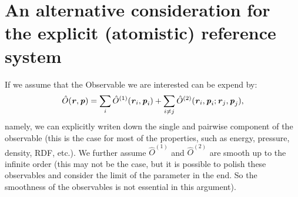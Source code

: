 \documentclass[aps,pre,preprint,unsortedaddress]{revtex4}
\renewcommand{\v}[1]{\textbf{\textit{#1}}}
\begin{document}
\section{An alternative consideration for the explicit (atomistic) reference system}
If we assume that the Observable we are interested can be expend by:
\begin{align}
  \hat O(\v r, \v p) =
  \sum_i\hat O^{(1)}(\v r_i, \v p_i) +
  \sum_{i\neq j}\hat O^{(2)}(\v r_i, \v p_i; \v r_j, \v p_j),
\end{align}
namely, we can explicitly writen down the single and pairwise
component of the observable (this is the case for most of the
properties, such as energy, pressure, density, RDF, etc.). We further
assume $\hat O^{(1)}$ and $\hat O^{(2)}$ are smooth up to the infinite
order (this may not be the case, but it is possible to polish these
observables and consider the limit of the parameter in the end. So the
smoothness of the observables is not essential in this argument).
\end{document}
